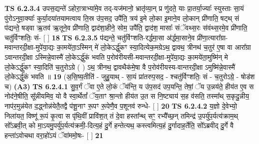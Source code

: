 \documentclass[17pt]{extarticle}
\begin{document}
                  \newline
                                \textbf{ TS 6.2.3.4} \newline
                  उपस॒द्यन्ते॑ ऽहोरा॒त्राभ्या॑मे॒व तद्-यज॑मानो॒ भ्रातृ॑व्या॒न् प्र णु॑दते॒ याः प्रा॒तर्या॒ज्याः᳚ स्युस्ताः सा॒यं पु॑रोऽनुवा॒क्याः᳚ कुर्या॒दया॑तयामत्वाय ति॒स्र उ॑प॒सद॒ उपै॑ति॒ त्रय॑ इ॒मे लो॒का इ॒माने॒व लो॒कान् प्री॑णाति॒ षट्थ् सं प॑द्यन्ते॒ षड्वा ऋ॒तव॑ ऋ॒तूने॒व प्री॑णाति॒ द्वाद॑शा॒हीने॒ सोम॒ उपै॑ति॒ द्वाद॑श॒ मासाः᳚ संॅवथ्स॒रः स॑वंथ्स॒रमे॒व प्री॑णाति॒ चतु॑र्विꣳशतिः॒ सं- [  ] \textbf{  18} \newline
                  \newline
                                \textbf{ TS 6.2.3.5} \newline
                  प॑द्यन्ते॒ चतु॑र्विꣳशति-रर्द्धमा॒सा अ॑र्द्धमा॒साने॒व प्री॑णा॒त्यारा᳚ग्रा-मवान्तरदी॒क्षा-मुपे॑या॒द्यः का॒मये॑ता॒ऽस्मिन् मे॑ लो॒केऽर्द्धु॑कꣳ स्या॒दित्येक॒मग्रेऽथ॒ द्वावथ॒ त्रीनथ॑ च॒तुर॑ ए॒षा वा आरा᳚ग्रा ऽवान्तरदी॒क्षा ऽस्मिन्ने॒वास्मै॑ लो॒केऽर्द्धु॑कं भवति प॒रोव॑रीयसी-मवान्तरदी॒क्षा-मुपे॑या॒द्यः का॒मये॑ता॒मुष्मि॑न् मे लो॒केऽर्द्धु॑कꣳ स्या॒दिति॑ च॒तुरोऽग्रे ( ) ऽथ॒ त्रीनथ॒ द्वावथैक॑मे॒षा वै प॒रोव॑रीयस्य-वान्तरदी॒क्षा ऽमुष्मि॑न्ने॒वास्मै॑ लो॒केऽर्द्धु॑कं भवति ॥ \textbf{  19} \newline
                  \newline
                      (अ॒सि॒ष्य॒तीति॑ - जुहु॒याथ् - सा॒यं प्रा॑तरुप॒सद॒ - श्चतु॑र्विꣳशतिः॒ सं - च॒तुरोऽग्रे॒ - षोड॑श च)  \textbf{(A3)} \newline \newline
                                        \textbf{ TS 6.2.4.1} \newline
                  सु॒व॒र्गं ॅवा ए॒ते लो॒कं ॅय॑न्ति॒ य उ॑प॒सद॑ उप॒यन्ति॒ तेषां॒ ॅय उ॒न्नय॑ते॒ हीय॑त ए॒व स नोद॑ने॒षीति॒ सू᳚न्नीयमिव॒ यो वै स्वा॒र्थेतां᳚ ॅय॒ताꣳ श्रा॒न्तो हीय॑त उ॒त स नि॒ष्ट्याय॑ स॒ह व॑सति॒ तस्मा᳚थ् स॒कृदु॒न्नीय॒ नाप॑र॒मुन्न॑येत द॒द्ध्नोन्न॑येतै॒तद्वै प॑शू॒नाꣳ रू॒पꣳ रू॒पेणै॒व प॒शूनव॑ रुन्धे- [  ] \textbf{  20} \newline
                  \newline
                                \textbf{ TS 6.2.4.2} \newline
                  य॒ज्ञो दे॒वेभ्यो॒ निला॑यत॒ विष्णू॑ रू॒पं कृ॒त्वा स पृ॑थि॒वीं प्रावि॑श॒त् तं दे॒वा हस्ता᳚न्थ् सꣳ॒॒ रभ्यै᳚च्छ॒न् तमिन्द्र॑ उ॒पर्यु॑प॒र्यत्य॑क्राम॒थ् सो᳚ऽब्रवी॒त् को मा॒ऽयमु॒पर्यु॑प॒र्यत्य॑क्रमी॒-दित्य॒हं दु॒र्गे हन्तेत्यथ॒ कस्त्वमित्य॒हं दु॒र्गादाह॒र्तेति॒ सो᳚ऽब्रवीद् दु॒र्गे वै हन्ता॑ऽवोचथा वरा॒हो॑ऽयं ॅवा॑ममो॒षः- [  ] \textbf{  21} \newline
\end{document}
